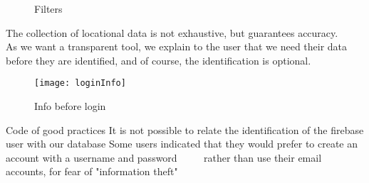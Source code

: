 \newpage
\begin{figure}[ht]
    \centering
    \hfill
   
  \caption{Filters}
    \end{figure}

    The collection of locational data is not exhaustive, but guarantees accuracy. \\

    As we want a transparent tool, we explain to the user that we need their data before
    they are identified, and of course, the identification is optional. \\

    \begin{figure}[ht]
        \centering
        \texttt{[image: loginInfo]}
        \caption{Info before login}
    \end{figure}

\begin{itemize}
    \done Code of good practices
    \done It is not possible to relate the identification of the firebase user with our database
    \crossed Some users indicated that they would prefer to create an account with a username and password
         rather than use their email accounts, for fear of "information theft"
    
\end{itemize}
\newpage